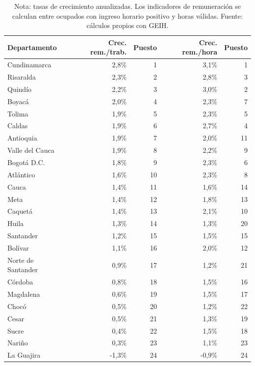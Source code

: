 \begin{table}[H]
\centering
\caption{Crecimiento de la remuneración laboral por departamento, 2009--2025}
\label{tab:dept_remuneracion_crecimientos_24}
\scriptsize
\begin{tabular}{lrrrr}
\toprule
Departamento & Crec. rem./trab. & Puesto & Crec. rem./hora & Puesto \\
\midrule
Cundinamarca & 2,8\% & 1 & 3,1\% & 1 \\
Risaralda & 2,3\% & 2 & 2,8\% & 3 \\
Quindío & 2,2\% & 3 & 3,0\% & 2 \\
Boyacá & 2,0\% & 4 & 2,3\% & 7 \\
Tolima & 1,9\% & 5 & 2,3\% & 5 \\
Caldas & 1,9\% & 6 & 2,7\% & 4 \\
Antioquia & 1,9\% & 7 & 2,0\% & 11 \\
Valle del Cauca & 1,9\% & 8 & 2,2\% & 9 \\
Bogotá D.C. & 1,8\% & 9 & 2,3\% & 6 \\
Atlántico & 1,6\% & 10 & 2,3\% & 8 \\
Cauca & 1,4\% & 11 & 1,6\% & 14 \\
Meta & 1,4\% & 12 & 1,8\% & 13 \\
Caquetá & 1,4\% & 13 & 2,1\% & 10 \\
Huila & 1,3\% & 14 & 1,3\% & 20 \\
Santander & 1,2\% & 15 & 1,5\% & 15 \\
Bolívar & 1,1\% & 16 & 2,0\% & 12 \\
Norte de Santander & 0,9\% & 17 & 1,2\% & 21 \\
Córdoba & 0,8\% & 18 & 1,5\% & 16 \\
Magdalena & 0,6\% & 19 & 1,5\% & 17 \\
Chocó & 0,5\% & 20 & 1,2\% & 22 \\
Cesar & 0,5\% & 21 & 1,3\% & 19 \\
Sucre & 0,4\% & 22 & 1,5\% & 18 \\
Nariño & 0,3\% & 23 & 1,1\% & 23 \\
La Guajira & -1,3\% & 24 & -0,9\% & 24 \\
\bottomrule
\end{tabular}
\caption*{\footnotesize Nota: tasas de crecimiento anualizadas. Los indicadores de remuneración se calculan entre ocupados con ingreso horario positivo y horas válidas. Fuente: cálculos propios con GEIH.}
\end{table}
